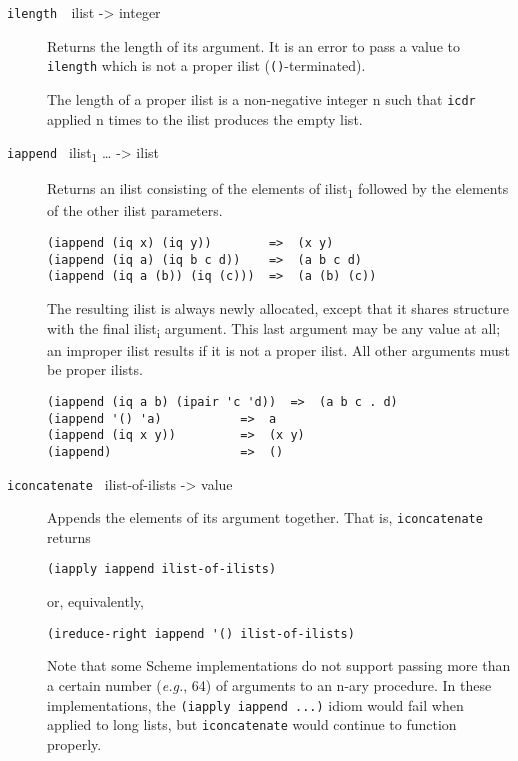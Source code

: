 \begin{description}
\item[ \href{}{} \texttt{ilength~~}ilist -\textgreater{} integer ]
Returns the length of its argument. It is an error to pass a value to
\texttt{ilength} which is not a proper ilist (\texttt{()}-terminated).

The length of a proper ilist is a non-negative integer n such that
\texttt{icdr} applied n times to the ilist produces the empty list.
\item[ \href{}{} \texttt{iappend~} ilist\textsubscript{1} \ldots{}
-\textgreater{} ilist ]
Returns an ilist consisting of the elements of ilist\textsubscript{1}
followed by the elements of the other ilist parameters.

\begin{verbatim}
(iappend (iq x) (iq y))        =>  (x y)
(iappend (iq a) (iq b c d))    =>  (a b c d)
(iappend (iq a (b)) (iq (c)))  =>  (a (b) (c))
\end{verbatim}

The resulting ilist is always newly allocated, except that it shares
structure with the final ilist\textsubscript{i} argument. This last
argument may be any value at all; an improper ilist results if it is not
a proper ilist. All other arguments must be proper ilists.

\begin{verbatim}
(iappend (iq a b) (ipair 'c 'd))  =>  (a b c . d)
(iappend '() 'a)           =>  a
(iappend (iq x y))         =>  (x y)
(iappend)                  =>  ()
\end{verbatim}
\item[ \href{}{} \texttt{iconcatenate~} ilist-of-ilists -\textgreater{}
value ]
Appends the elements of its argument together. That is,
\texttt{iconcatenate} returns

\begin{verbatim}
(iapply iappend ilist-of-ilists)
\end{verbatim}

or, equivalently,

\begin{verbatim}
(ireduce-right iappend '() ilist-of-ilists)
\end{verbatim}

Note that some Scheme implementations do not support passing more than a
certain number (\emph{e.g.}, 64) of arguments to an n-ary procedure. In
these implementations, the \texttt{(iapply\ iappend\ ...)} idiom would
fail when applied to long lists, but \texttt{iconcatenate} would
continue to function properly.


\end{description}
